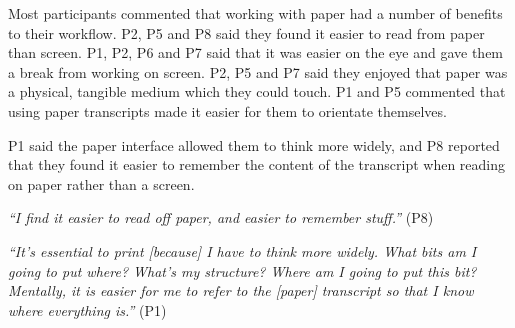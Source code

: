 Most participants commented that working with paper had a number of benefits to their workflow.  P2, P5 and P8 said
they found it easier to read from paper than screen.  P1, P2, P6 and P7 said that it was easier on the eye and gave
them a break from working on screen.  P2, P5 and P7 said they enjoyed that paper was a physical, tangible medium which
they could touch.  P1 and P5 commented that using paper transcripts made it easier for them to orientate themselves.


P1 said the paper interface allowed them to think more widely, and P8 reported that they found it easier to remember
the content of the transcript when reading on paper rather than a screen. 




\textit{``I find it easier to read off paper, and easier to remember stuff.''} (P8)

\textit{``It's essential to print [because]
I have to think more widely. What bits am I going to put where? What's my
  structure? Where am I going to put this bit? Mentally, it is easier for me to refer to the [paper] transcript so
that I know where everything is.''} (P1)



